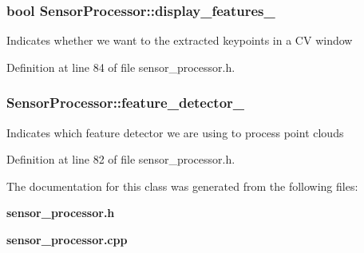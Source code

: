 \subsubsection[{display\-\_\-features\-\_\-}]{\setlength{\rightskip}{0pt plus 5cm}bool {\bf \-Sensor\-Processor\-::display\-\_\-features\-\_\-}\hspace{0.3cm}{\ttfamily  [private]}}\label{classSensorProcessor_a52d79e6da37dac67c7da671555896d7f}
\-Indicates whether we want to the extracted keypoints in a \-C\-V window 

\-Definition at line 84 of file sensor\-\_\-processor.\-h.

\subsubsection[{feature\-\_\-detector\-\_\-}]{ {\bf \-Sensor\-Processor\-::feature\-\_\-detector\-\_\-}\hspace{0.3cm}{\ttfamily  [private]}}\label{classSensorProcessor_a67a789139df008dc90b0054bea9a6b1d}
\-Indicates which feature detector we are using to process point clouds 

\-Definition at line 82 of file sensor\-\_\-processor.\-h.



\-The documentation for this class was generated from the following files\-:\begin{DoxyCompactItemize}
\item 
{\bf sensor\-\_\-processor.\-h}\item 
{\bf sensor\-\_\-processor.\-cpp}\end{DoxyCompactItemize}
